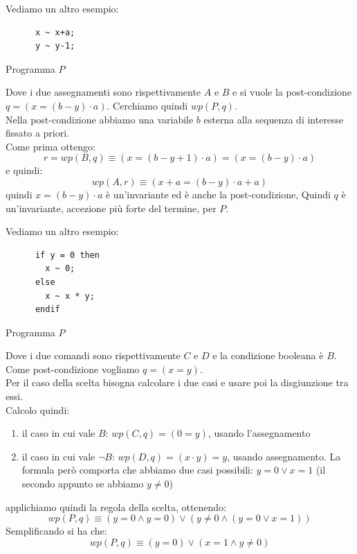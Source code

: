 				      				\begin{esempio}
				      					Vediamo un altro esempio:
				      					\begin{listing}[H]
				      						\begin{lstlisting}
      x ~ x+a;
      y ~ y-1;
				      						\end{lstlisting}
				      						\caption{Programma $P$}
				      					\end{listing}
				      					Dove i due assegnamenti sono rispettivamente $A$ e $B$ e si vuole la
				      					post-condizione $q=(x=(b-y)\cdot a)$. Cerchiamo quindi $wp(P, q)$.\\
				      					Nella post-condizione abbiamo una variabile $b$ esterna alla sequenza di interesse
				      					fissato a priori.\\
				      					Come prima ottengo:
				      					\[r=wp(B, q)\equiv(x=(b-y+1)\cdot a)=(x=(b-y)\cdot a)\]
				      					e quindi:
				      					\[wp(A, r)\equiv(x+a=(b-y)\cdot a+a)\]
				      					quindi $x=(b-y)\cdot a$ è un'invariante ed è anche la post-condizione, Quindi $q$
				      					è un'invariante, accezione più forte del termine, per $P$.
				      				\end{esempio}
				      				\begin{esempio}
				      					Vediamo un altro esempio:
				      					\begin{listing}[H]
				      						\begin{lstlisting}
      if y = 0 then
        x ~ 0;
      else
        x ~ x * y;
      endif
				      						\end{lstlisting}
				      						\caption{Programma $P$}
				      					\end{listing}
				      					Dove i due comandi sono rispettivamente $C$ e $D$ e la condizione booleana è
				      					$B$. Come post-condizione vogliamo $q=(x=y)$.\\
				      					Per il caso della scelta bisogna calcolare i due casi e usare poi la
				      					disgiunzione tra essi.\\
				      					Calcolo quindi:
				      					\begin{enumerate}
				      						\item il caso in cui vale $B$: $wp(C, q)=(0=y)$, usando l'assegnamento
				      						\item il caso in cui vale $\neg B$: $wp(D, q)=(x\cdot y)=y$, usando
				      						      assegnamento. La formula però comporta che abbiamo due casi possibili: $y=0\lor
				      						      x=1$ (il secondo appunto se abbiamo $y\neq 0$)
				      					\end{enumerate}
				      					applichiamo quindi la regola della scelta, ottenendo:
				      					\[wp(P, q)\equiv (y=0\land y=0)\lor(y\neq 0\land (y=0\lor x=1))\]
				      					Semplificando si ha che:
				      					\[wp(P, q)\equiv(y=0)\lor(x=1\land y\neq 0)\]
				      				\end{esempio}
